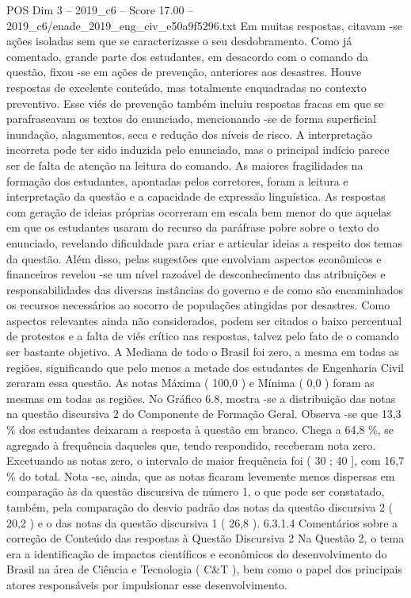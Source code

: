 \begin{textsample}{POS Dim 3 – 2019\_c6 – Score 17.00 – 2019\_c6/enade\_2019\_eng\_civ\_e50a9f5296.txt}
Em muitas respostas, citavam -se ações isoladas sem que se caracterizasse o seu desdobramento.
Como já comentado, grande parte dos estudantes, em desacordo com o comando da questão, fixou -se em ações de prevenção, anteriores aos desastres.
Houve respostas de excelente conteúdo, mas totalmente enquadradas no contexto preventivo.
Esse viés de prevenção também incluiu respostas fracas em que se parafraseavam os textos do enunciado, mencionando -se de forma superficial inundação, alagamentos, seca e redução dos níveis de risco.
A interpretação incorreta pode ter sido induzida pelo enunciado, mas o principal indício parece ser de falta de atenção na leitura do comando.
As maiores fragilidades na formação dos estudantes, apontadas pelos corretores, foram a leitura e interpretação da questão e a capacidade de expressão linguística.
As respostas com geração de ideias próprias ocorreram em escala bem menor do que aquelas em que os estudantes usaram do recurso da paráfrase pobre sobre o texto do enunciado, revelando dificuldade para criar e articular ideias a respeito dos temas da questão.
Além disso, pelas sugestões que envolviam aspectos econômicos e financeiros revelou -se um nível razoável de desconhecimento das atribuições e responsabilidades das diversas instâncias do governo e de como são encaminhados os recursos necessários ao socorro de populações atingidas por desastres.
Como aspectos relevantes ainda não considerados, podem ser citados o baixo percentual de protestos e a falta de viés crítico nas respostas, talvez pelo fato de o comando ser bastante objetivo.
A Mediana de todo o Brasil foi zero, a mesma em todas as regiões, significando que pelo menos a metade dos estudantes de Engenharia Civil zeraram essa questão.
As notas Máxima ( 100,0 ) e Mínima ( 0,0 ) foram as mesmas em todas as regiões.
No Gráfico 6.8, mostra -se a distribuição das notas na questão discursiva 2 do Componente de Formação Geral.
Observa -se que 13,3 \% dos estudantes deixaram a resposta à questão em branco.
Chega a 64,8 \%, se agregado à frequência daqueles que, tendo respondido, receberam nota zero.
Excetuando as notas zero, o intervalo de maior frequência foi ( 30 ; 40 ], com 16,7 \% do total.
Nota -se, ainda, que as notas ficaram levemente menos dispersas em comparação às da questão discursiva de número 1, o que pode ser constatado, também, pela comparação do desvio padrão das notas da questão discursiva 2 ( 20,2 ) e o das notas da questão discursiva 1 ( 26,8 ). 6.3.1.4 Comentários sobre a correção de Conteúdo das respostas à Questão Discursiva 2 Na Questão 2, o tema era a identificação de impactos científicos e econômicos do desenvolvimento do Brasil na área de Ciência e Tecnologia ( C\&T ), bem como o papel dos principais atores responsáveis por impulsionar esse desenvolvimento.

\end{textsample}
